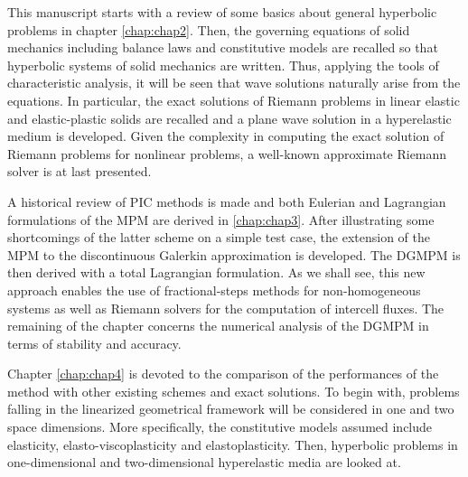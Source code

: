 This manuscript starts with a review of some basics about general hyperbolic problems in chapter \ref{chap:chap2}.
Then, the governing equations of solid mechanics including balance laws and constitutive models are recalled so that hyperbolic systems of solid mechanics are written.
Thus, applying the tools of characteristic analysis, it will be seen that wave solutions naturally arise from the equations. %
In particular, the exact solutions of Riemann problems in linear elastic and elastic-plastic solids are recalled and a plane wave solution in a hyperelastic medium is developed.
Given the complexity in computing the exact solution of Riemann problems for nonlinear problems, a well-known approximate Riemann solver is at last presented.


A historical review of PIC methods is made and both Eulerian and Lagrangian formulations of the MPM are derived in \ref{chap:chap3}.
After illustrating some shortcomings of the latter scheme on a simple test case, the extension of the MPM to the discontinuous Galerkin approximation is developed.
The DGMPM is then derived with a total Lagrangian formulation.
As we shall see, this new approach enables the use of fractional-steps methods for non-homogeneous systems as well as Riemann solvers for the computation of intercell fluxes.
The remaining of the chapter concerns the numerical analysis of the DGMPM in terms of stability and accuracy.


Chapter \ref{chap:chap4} is devoted to the comparison of the performances of the method with other existing schemes and exact solutions.
To begin with, problems falling in the linearized geometrical framework will be considered in one and two space dimensions.
More specifically, the constitutive models assumed include elasticity, elasto-viscoplasticity and elastoplasticity.
Then, hyperbolic problems in one-dimensional and two-dimensional hyperelastic media are looked at.

